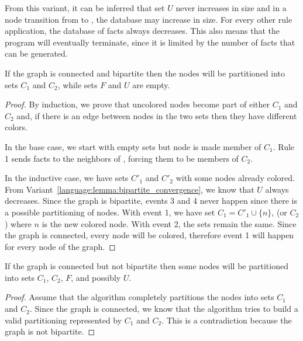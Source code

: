 From this variant, it can be inferred that set $U$ never increases in size
and in a node transition from  to , the
database may increase in size. For every other rule application, the database of
facts always decreases. This also means that the program will eventually
terminate, since it is limited by the number of  facts that can be
generated.

\begin{theorem}

If the graph is connected and bipartite then the nodes will be partitioned into sets
$C_{1}$ and $C_{2}$, while sets $F$ and $U$ are empty.

\end{theorem}
\begin{proof}
   By induction, we prove that uncolored nodes become part of either $C_{1}$
   and $C_{2}$ and, if there is an edge between nodes in the two sets then
   they have different colors.

   In the base case, we start with empty sets but node  is made
   member of $C_{1}$. Rule 1 sends  facts to the neighbors of
   , forcing them to be members of $C_{2}$.

   In the inductive case, we have sets $C'_{1}$ and $C'_{2}$ with some nodes
   already colored. From Variant~\ref{language:lemma:bipartite_convergence}, we
   know that $U$ always decreases. Since the graph is bipartite, events 3 and 4
   never happen since there is a possible partitioning of nodes. With event 1,
   we have set $C_{1} = C'_{1} \cup \{n\}$, (or $C_{2}$) where $n$ is the new
   colored node. With event 2, the sets remain the same. Since the graph is
   connected, every node will be colored, therefore event 1 will happen for
   every node of the graph.

\end{proof}

\begin{theorem}
If the graph is connected but not bipartite then some nodes will be partitioned
into sets $C_{1}$, $C_{2}$, $F$, and possibly $U$.
\end{theorem}
\begin{proof}

Assume that the algorithm completely partitions the nodes into sets $C_{1}$
and $C_{2}$. Since the graph is connected, we know that the algorithm tries
to build a valid partitioning represented by $C_{1}$ and $C_{2}$. This is
a contradiction because the graph is not bipartite.

\end{proof}

